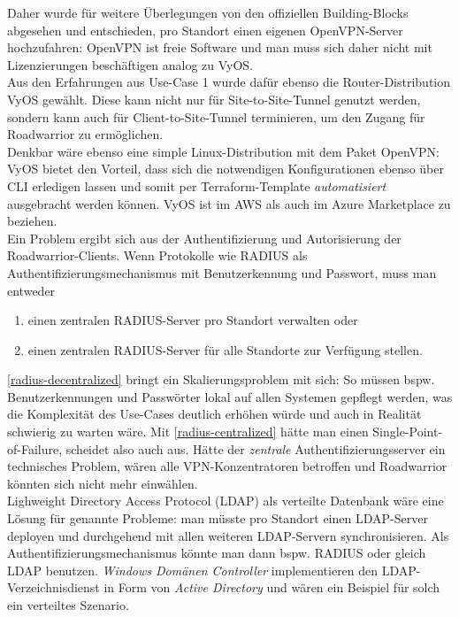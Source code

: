 Daher wurde für weitere Überlegungen von den offiziellen Building-Blocks abgesehen und entschieden, pro Standort einen eigenen OpenVPN-Server hochzufahren: OpenVPN ist freie Software und man muss sich daher nicht mit Lizenzierungen beschäftigen analog zu VyOS.\\
Aus den Erfahrungen aus Use-Case 1 wurde dafür ebenso die Router-Distribution VyOS gewählt. Diese kann nicht nur für Site-to-Site-Tunnel genutzt werden, sondern kann auch für Client-to-Site-Tunnel terminieren, um den Zugang für Roadwarrior zu ermöglichen.\\
Denkbar wäre ebenso eine simple Linux-Distribution mit dem Paket OpenVPN: VyOS bietet den Vorteil, dass sich die notwendigen Konfigurationen ebenso über CLI erledigen lassen und somit per Terraform-Template \textit{automatisiert} ausgebracht werden können\cite{vyosopenvpn2021}. VyOS ist im AWS als auch im Azure Marketplace zu beziehen.\\
Ein Problem ergibt sich aus der Authentifizierung und Autorisierung der Roadwarrior-Clients. Wenn Protokolle wie RADIUS\cite{rfc2865} als Authentifizierungsmechanismus mit Benutzerkennung und Passwort, muss man entweder
\begin{enumerate}[label=(\alph*)]
\item \label{radius-decentralized} einen zentralen RADIUS-Server pro Standort verwalten oder
\item \label{radius-centralized} einen zentralen RADIUS-Server für alle Standorte zur Verfügung stellen.
\end{enumerate}
\ref{radius-decentralized} bringt ein Skalierungsproblem mit sich: So müssen bspw. Benutzerkennungen und Passwörter lokal auf allen Systemen gepflegt werden, was die Komplexität des Use-Cases deutlich erhöhen würde und auch in Realität schwierig zu warten wäre. Mit \ref{radius-centralized} hätte man einen Single-Point-of-Failure, scheidet also auch aus. Hätte der \textit{zentrale} Authentifizierungsserver ein technisches Problem, wären alle VPN-Konzentratoren betroffen und Roadwarrior könnten sich nicht mehr einwählen.\\
Lighweight Directory Access Protocol (LDAP)\cite{rfc4511} als verteilte Datenbank wäre eine Lösung für genannte Probleme: man müsste pro Standort einen LDAP-Server deployen und durchgehend mit allen weiteren LDAP-Servern synchronisieren. Als Authentifizierungsmechanismus könnte man dann bspw. RADIUS\cite{rfc2865} oder gleich LDAP benutzen. \textit{Windows Domänen Controller} implementieren den LDAP-Verzeichnisdienst in Form von \textit{Active Directory} und wären ein Beispiel für solch ein verteiltes Szenario.\cite[S.603-604]{Tanenbaum2003}\\
